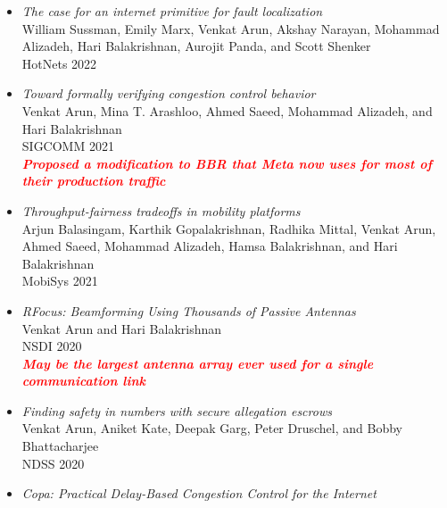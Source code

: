 \documentclass[notitlepage]{article}
\newcommand{\highlight}[1]{\textcolor{red}{\textit{\textbf{#1}}}}
\begin{document}
\begin{itemize}[noitemsep,nolistsep]
      Frank Cangialosi, Neil Agarwal, Venkat Arun, Srinivas Narayana, Anand Sarwate, and Ravi Netravali\\
      NSDI 2022\\
              \item {\it The case for an internet primitive for fault localization}\label{paper:wtf}\\
      William Sussman, Emily Marx, Venkat Arun, Akshay Narayan, Mohammad Alizadeh, Hari Balakrishnan, Aurojit Panda, and Scott Shenker\\
      HotNets 2022\\
              \item {\it Toward formally verifying congestion control behavior}\label{paper:ccac}\\
      Venkat Arun, Mina T. Arashloo, Ahmed Saeed, Mohammad Alizadeh, and Hari Balakrishnan\\
      SIGCOMM 2021\\
              \highlight{Proposed a modification to BBR that Meta now uses for most of their production traffic}\\
              \item {\it Throughput-fairness tradeoffs in mobility platforms}\label{paper:drones}\\
      Arjun Balasingam, Karthik Gopalakrishnan, Radhika Mittal, Venkat Arun, Ahmed Saeed, Mohammad Alizadeh, Hamsa Balakrishnan, and Hari Balakrishnan\\
      MobiSys 2021\\
              \item {\it RFocus: Beamforming Using Thousands of Passive Antennas}\label{paper:rfocus}\\
      Venkat Arun and Hari Balakrishnan\\
      NSDI 2020\\
              \highlight{May be the largest antenna array ever used for a single communication link}\\
              \item {\it Finding safety in numbers with secure allegation escrows}\label{paper:sae}\\
      Venkat Arun, Aniket Kate, Deepak Garg, Peter Druschel, and Bobby Bhattacharjee\\
      NDSS 2020\\
              \item {\it Copa: Practical Delay-Based Congestion Control for the Internet}\label{paper:copa}\\

\end{itemize}
\end{document}
